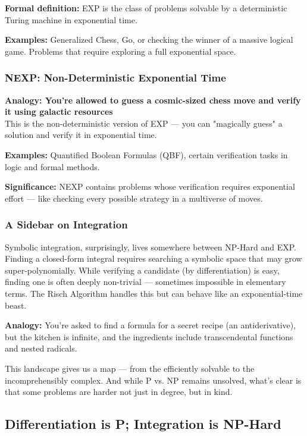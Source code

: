 \textbf{Formal definition:} EXP is the class of problems solvable by a deterministic Turing machine in exponential time.

\textbf{Examples:} Generalized Chess, Go, or checking the winner of a massive logical game. Problems that require exploring a full exponential space.

\subsubsection{NEXP: Non-Deterministic Exponential Time}

\textbf{Analogy: You're allowed to guess a cosmic-sized chess move and verify it using galactic resources} \\
This is the non-deterministic version of EXP — you can "magically guess" a solution and verify it in exponential time.

\textbf{Examples:} Quantified Boolean Formulas (QBF), certain verification tasks in logic and formal methods.

\textbf{Significance:} NEXP contains problems whose verification requires exponential effort — like checking every possible strategy in a multiverse of moves.

\subsubsection{A Sidebar on Integration}

Symbolic integration, surprisingly, lives somewhere between NP-Hard and EXP. Finding a closed-form integral requires searching a symbolic space that may grow super-polynomially. While verifying a candidate (by differentiation) is easy, finding one is often deeply non-trivial — sometimes impossible in elementary terms. The Risch Algorithm handles this but can behave like an exponential-time beast.

\textbf{Analogy:} You're asked to find a formula for a secret recipe (an antiderivative), but the kitchen is infinite, and the ingredients include transcendental functions and nested radicals.

\vspace{1em}
This landscape gives us a map — from the efficiently solvable to the incomprehensibly complex. And while P vs. NP remains unsolved, what’s clear is that some problems are harder not just in degree, but in kind.


\subsection{Differentiation is P; Integration is NP-Hard}

